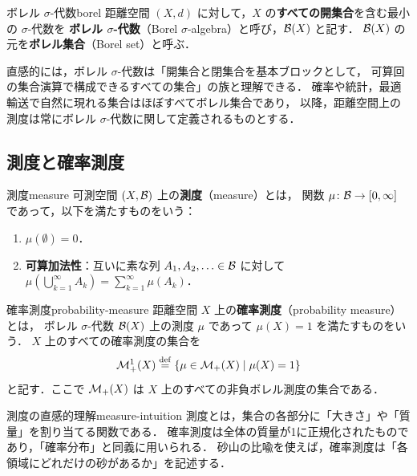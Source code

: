 \begin{definition}{ボレル $\sigma$-代数}{borel}
  距離空間 $(X, d)$ に対して，$X$ の\textbf{すべての開集合}を含む最小の $\sigma$-代数を
  \textbf{ボレル $\sigma$-代数}（Borel $\sigma$-algebra）と呼び，$\mathcal{B}(X)$ と記す．
  $\mathcal{B}(X)$ の元を\textbf{ボレル集合}（Borel set）と呼ぶ．
\end{definition}

直感的には，ボレル $\sigma$-代数は「開集合と閉集合を基本ブロックとして，
可算回の集合演算で構成できるすべての集合」の族と理解できる．
確率や統計，最適輸送で自然に現れる集合はほぼすべてボレル集合であり，
以降，距離空間上の測度は常にボレル $\sigma$-代数に関して定義されるものとする．

\subsection{測度と確率測度}
\label{subsec:measures}

\begin{definition}{測度}{measure}
  可測空間 $(X, \mathcal{B})$ 上の\textbf{測度}（measure）とは，
  関数 $\mu \colon \mathcal{B} \to [0, \infty]$ であって，以下を満たすものをいう：
  \begin{enumerate}
    \item $\mu(\emptyset) = 0$．
    \item \textbf{可算加法性}：互いに素な列 $A_1, A_2, \ldots \in \mathcal{B}$
      に対して $\mu\!\left(\bigcup_{k=1}^{\infty} A_k\right) = \sum_{k=1}^{\infty} \mu(A_k)$．
  \end{enumerate}
\end{definition}

\begin{definition}{確率測度}{probability-measure}
  距離空間 $X$ 上の\textbf{確率測度}（probability measure）とは，
  ボレル $\sigma$-代数 $\mathcal{B}(X)$ 上の測度 $\mu$ であって $\mu(X) = 1$ を満たすものをいう．
  $X$ 上のすべての確率測度の集合を
  \[
    \mathcal{M}_+^1(X) \overset{\mathrm{def}}{=} \left\{ \mu \in \mathcal{M}_+(X) \;\middle|\; \mu(X) = 1 \right\}
  \]
  と記す．ここで $\mathcal{M}_+(X)$ は $X$ 上のすべての非負ボレル測度の集合である．
\end{definition}

\begin{remark}{測度の直感的理解}{measure-intuition}
  測度とは，集合の各部分に「大きさ」や「質量」を割り当てる関数である．
  確率測度は全体の質量が1に正規化されたものであり，「確率分布」と同義に用いられる．
  砂山の比喩を使えば，確率測度は「各領域にどれだけの砂があるか」を記述する．
\end{remark}


